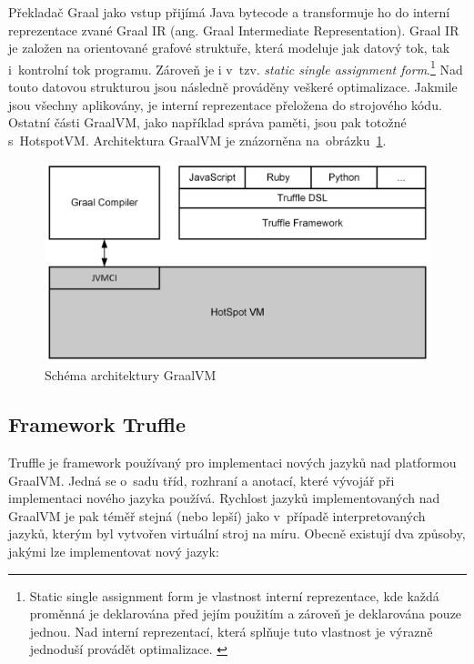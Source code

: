 \documentclass[
  master,
  biblatex,
  figures=true,
  theorems,
  sourcecodes,
  glossaries,
  index
]{kidiplom}
\begin{document}
Překladač Graal jako vstup přijímá Java bytecode a transformuje ho do interní reprezentace zvané Graal IR (ang. Graal Intermediate Representation). Graal IR je založen na orientované grafové struktuře, která modeluje jak datový tok, tak i~kontrolní tok programu. Zároveň je i v~tzv. \textit{static single assignment form}.\footnote{Static single assignment form je vlastnost interní reprezentace, kde každá proměnná je deklarována před jejím použitím a zároveň je deklarována pouze jednou. Nad interní reprezentací, která splňuje tuto vlastnost je výrazně jednoduší provádět optimalizace. \cite{ssa}} Nad touto datovou strukturou jsou následně prováděny veškeré optimalizace. Jakmile jsou všechny aplikovány, je interní reprezentace přeložena do strojového kódu. Ostatní části GraalVM, jako například správa paměti, jsou pak totožné s~HotspotVM. Architektura GraalVM je znázorněna na~obrázku~\ref{fig:graalvm-architecture}. \cite{graal-ir}


\begin{figure} [h]
    \centering
    \includegraphics[width= 1\textwidth]{images/graal-architecture.png}
    \caption{Schéma architektury GraalVM}
    \label{fig:graalvm-architecture}
\end{figure}

\subsection{Framework Truffle}
\label{truffle-framework-chapter}
Truffle je framework používaný pro implementaci nových jazyků nad platformou GraalVM. Jedná se o~sadu tříd, rozhraní a anotací, které vývojář při implementaci nového jazyka používá. Rychlost jazyků implementovaných nad GraalVM je pak téměř stejná (nebo lepší) jako v~případě interpretovaných jazyků, kterým byl vytvořen virtuální stroj na míru. Obecně existují dva způsoby, jakými lze implementovat nový jazyk: 
\end{document}
